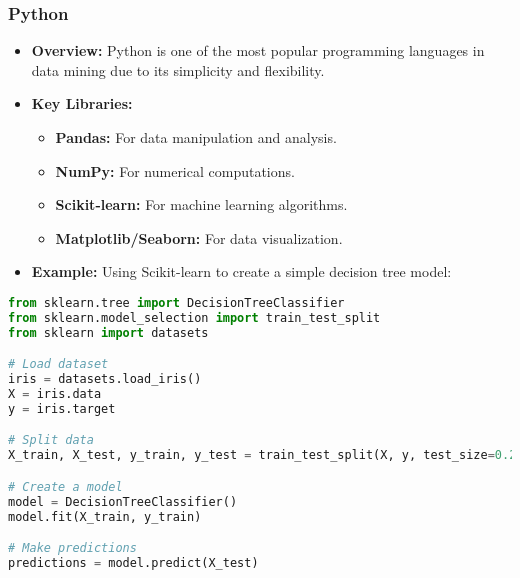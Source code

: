 \documentclass[aspectratio=169]{beamer}
\begin{document}
\begin{frame}[fragile]
    \frametitle{Python}
    \begin{itemize}
        \item \textbf{Overview:} 
        Python is one of the most popular programming languages in data mining due to its simplicity and flexibility. 
        \item \textbf{Key Libraries:}
            \begin{itemize}
                \item \textbf{Pandas:} For data manipulation and analysis.
                \item \textbf{NumPy:} For numerical computations.
                \item \textbf{Scikit-learn:} For machine learning algorithms.
                \item \textbf{Matplotlib/Seaborn:} For data visualization.
            \end{itemize}
        \item \textbf{Example:} Using Scikit-learn to create a simple decision tree model:
    \end{itemize}
    \begin{lstlisting}[language=Python]
from sklearn.tree import DecisionTreeClassifier
from sklearn.model_selection import train_test_split
from sklearn import datasets

# Load dataset
iris = datasets.load_iris()
X = iris.data
y = iris.target

# Split data
X_train, X_test, y_train, y_test = train_test_split(X, y, test_size=0.2, random_state=42)

# Create a model
model = DecisionTreeClassifier()
model.fit(X_train, y_train)

# Make predictions
predictions = model.predict(X_test)
    \end{lstlisting}
\end{frame}
\end{document}
